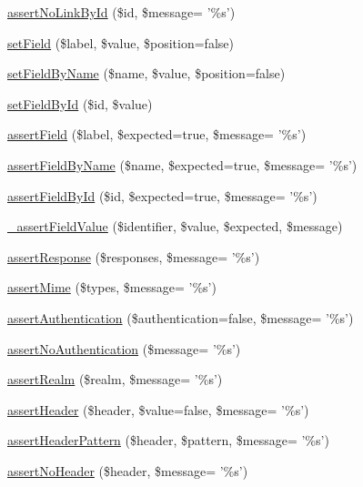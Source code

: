 \begin{DoxyCompactItemize}
\item 
\hyperlink{class_web_test_case_abd3882e405ceda10d1a4c0063e4bd07a}{assertNoLinkById} (\$id, \$message= '\%s')
\item 
\hyperlink{class_web_test_case_a2b8f21394a225f1386c22f671a6debc0}{setField} (\$label, \$value, \$position=false)
\item 
\hyperlink{class_web_test_case_ab3d6b5e72b290f14f51148642f1681e4}{setFieldByName} (\$name, \$value, \$position=false)
\item 
\hyperlink{class_web_test_case_a677f77692fd67768ad837a258a7ef4fd}{setFieldById} (\$id, \$value)
\item 
\hyperlink{class_web_test_case_a2ff4ade56d51b73cd30290456ee94d74}{assertField} (\$label, \$expected=true, \$message= '\%s')
\item 
\hyperlink{class_web_test_case_abfdb01d4f19a545a174dc1989d1edc88}{assertFieldByName} (\$name, \$expected=true, \$message= '\%s')
\item 
\hyperlink{class_web_test_case_a5bb2fcfa5ff8540f77829901370ade99}{assertFieldById} (\$id, \$expected=true, \$message= '\%s')
\item 
\hyperlink{class_web_test_case_a4aaf6a1b573b4523fc02800eaf63ba90}{\_\-assertFieldValue} (\$identifier, \$value, \$expected, \$message)
\item 
\hyperlink{class_web_test_case_a974043ce5e246d9d61aa2432fa460118}{assertResponse} (\$responses, \$message= '\%s')
\item 
\hyperlink{class_web_test_case_ad3447866f2462d2efd18e70657ff19ee}{assertMime} (\$types, \$message= '\%s')
\item 
\hyperlink{class_web_test_case_a1cf868c95aec441290995d71aba42f0a}{assertAuthentication} (\$authentication=false, \$message= '\%s')
\item 
\hyperlink{class_web_test_case_aa3d977b11d4cd690ad1644b0103de9d1}{assertNoAuthentication} (\$message= '\%s')
\item 
\hyperlink{class_web_test_case_acc61e0a6d07f19005ee26e1cf98b813b}{assertRealm} (\$realm, \$message= '\%s')
\item 
\hyperlink{class_web_test_case_a62b3bb8ba4a2f6439a336e69fe60e40e}{assertHeader} (\$header, \$value=false, \$message= '\%s')
\item 
\hyperlink{class_web_test_case_ae5e82c9a2219c4aa1d65d42b8a7286a0}{assertHeaderPattern} (\$header, \$pattern, \$message= '\%s')
\item 
\hyperlink{class_web_test_case_aaad06de3e0ed7fb74081ff9a6633a3fb}{assertNoHeader} (\$header, \$message= '\%s')

\end{DoxyCompactItemize}
